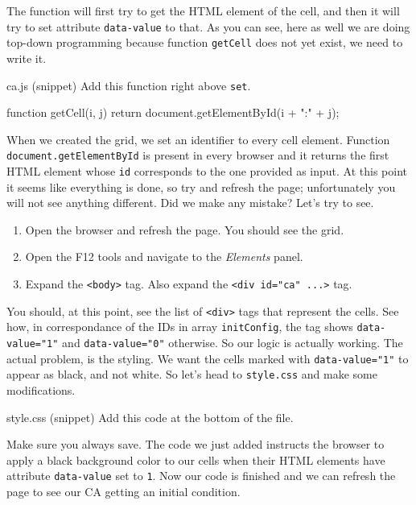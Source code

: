 The function will first try to get the HTML element of the cell, and then it will try to set attribute
\texttt{data-value} to that. As you can see, here as well we are doing top-down programming because
function \texttt{getCell} does not yet exist, we need to write it.

\begin{programcode}{ca.js (snippet)}
Add this function right above \texttt{set}.
\begin{code}
function getCell(i, j) {
  return document.getElementById(i + ":" + j);
}
\end{code}
\end{programcode}

When we created the grid, we set an identifier to every cell element. Function \texttt{document.getElementById}
is present in every browser and it returns the first HTML element whose \texttt{id} corresponds to the one
provided as input. At this point it seems like everything is done, so try and refresh the page; unfortunately
you will not see anything different. Did we make any mistake? Let's try to see.

\begin{enumerate}
\item Open the browser and refresh the page. You should see the grid.
\item Open the F12 tools and navigate to the \textit{Elements} panel.
\item Expand the \texttt{<body>} tag. Also expand the \texttt{<div id="ca" ...>} tag.
\end{enumerate}

You should, at this point, see the list of \texttt{<div>} tags that represent the cells. See how, in correspondance
of the IDs in array \texttt{initConfig}, the tag shows \texttt{data-value="1"} and \texttt{data-value="0"}
otherwise. So our logic is actually working. The actual problem, is the styling. We want the cells marked with
\texttt{data-value="1"} to appear as black, and not white. So let's head to \texttt{style.css} and make some
modifications.

\begin{programcode}{style.css (snippet)}
Add this code at the bottom of the file.
\end{programcode}

Make sure you always save. The code we just added instructs the browser to apply a black background color
to our cells when their HTML elements have attribute \texttt{data-value} set to \texttt{1}.
Now our code is finished and we can refresh the page to see our CA getting an initial
condition.

